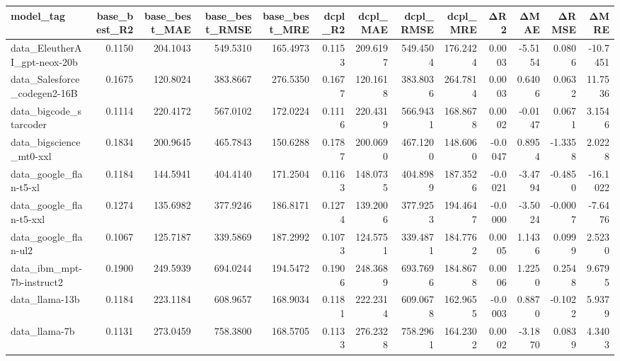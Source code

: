 \begin{tabular}{lrrrrrrrrrrrr}
\toprule
model\_tag & base\_best\_R2 & base\_best\_MAE & base\_best\_RMSE & base\_best\_MRE & dcpl\_R2 & dcpl\_MAE & dcpl\_RMSE & dcpl\_MRE & ΔR2 & ΔMAE & ΔRMSE & ΔMRE \\
\midrule
data\_EleutherAI\_gpt-neox-20b & 0.1150 & 204.1043 & 549.5310 & 165.4973 & 0.1153 & 209.6197 & 549.4504 & 176.2424 & 0.0003 & -5.5154 & 0.0806 & -10.7451 \\
data\_Salesforce\_codegen2-16B & 0.1675 & 120.8024 & 383.8667 & 276.5350 & 0.1677 & 120.1618 & 383.8036 & 264.7814 & 0.0003 & 0.6406 & 0.0632 & 11.7536 \\
data\_bigcode\_starcoder & 0.1114 & 220.4172 & 567.0102 & 172.0224 & 0.1116 & 220.4319 & 566.9431 & 168.8678 & 0.0002 & -0.0147 & 0.0671 & 3.1546 \\
data\_bigscience\_mt0-xxl & 0.1834 & 200.9645 & 465.7843 & 150.6288 & 0.1787 & 200.0690 & 467.1200 & 148.6060 & -0.0047 & 0.8954 & -1.3358 & 2.0228 \\
data\_google\_flan-t5-xl & 0.1184 & 144.5941 & 404.4140 & 171.2504 & 0.1163 & 148.0735 & 404.8989 & 187.3526 & -0.0021 & -3.4794 & -0.4850 & -16.1022 \\
data\_google\_flan-t5-xxl & 0.1274 & 135.6982 & 377.9246 & 186.8171 & 0.1274 & 139.2006 & 377.9253 & 194.4647 & -0.0000 & -3.5024 & -0.0007 & -7.6476 \\
data\_google\_flan-ul2 & 0.1067 & 125.7187 & 339.5869 & 187.2992 & 0.1073 & 124.5751 & 339.4871 & 184.7762 & 0.0005 & 1.1436 & 0.0999 & 2.5230 \\
data\_ibm\_mpt-7b-instruct2 & 0.1900 & 249.5939 & 694.0244 & 194.5472 & 0.1906 & 248.3689 & 693.7696 & 184.8678 & 0.0006 & 1.2250 & 0.2548 & 9.6795 \\
data\_llama-13b & 0.1184 & 223.1184 & 608.9657 & 168.9034 & 0.1181 & 222.2314 & 609.0678 & 162.9655 & -0.0003 & 0.8870 & -0.1022 & 5.9379 \\
data\_llama-7b & 0.1131 & 273.0459 & 758.3800 & 168.5705 & 0.1133 & 276.2328 & 758.2961 & 164.2302 & 0.0002 & -3.1870 & 0.0839 & 4.3403 \\
\bottomrule
\end{tabular}
